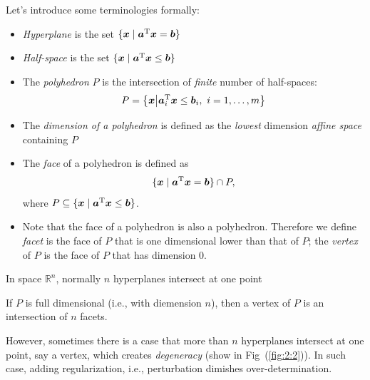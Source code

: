 Let's introduce some terminologies formally:
\begin{definition}
\begin{itemize}
\item
\emph{Hyperplane} is the set $\{\bm x\mid \bm a^{\mathrm T}\bm x=\bm b\}$
\item
\emph{Half-space} is the set $\{\bm x\mid\bm a^{\mathrm T}\bm x\le\bm b\}$
\item
The \emph{polyhedron} $P$ is the intersection of \emph{finite} number of half-spaces:
\[
P=\left\{
\bm x\middle|
\bm a_i^{\mathrm T} \bm x\le \bm b_i,
\ i=1,\dots,m
\right\}
\]
\item
The \emph{dimension of a polyhedron} is defined as the \emph{lowest} dimension \emph{affine space} containing $P$
\item
The \emph{face} of a polyhedron is defined as
\[
\{\bm x\mid \bm a^{\mathrm T}\bm x=\bm b\}\cap P,
\]
where $P\subseteq\{\bm x\mid \bm a^{\mathrm T}\bm x\le\bm b\}$.
\item
Note that the face of a polyhedron is also a polyhedron. Therefore we define \emph{facet} is the face of $P$ that is one dimensional lower than that of $P$; the \emph{vertex} of $P$ is the face of $P$ that has dimension $0$.
\end{itemize}
\end{definition}
\begin{remark}
In space $\mathbb{R}^n$, normally $n$ hyperplanes intersect at one point
\item
If $P$ is full dimensional (i.e., with diemension $n$), then a vertex of $P$ is an intersection of $n$ facets.
\item
However, sometimes there is a case that more than $n$ hyperplanes intersect at one point, say a vertex, which creates \emph{degeneracy} (show in Fig~(\ref{fig:2:2})).
In such case, adding regularization, i.e., perturbation dimishes over-determination.
\end{remark}
